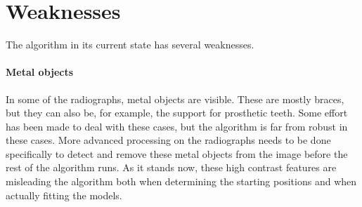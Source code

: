 \documentclass[a4paper,10pt]{article}
\begin{document}
\section{Weaknesses}
The algorithm in its current state has several weaknesses.

\paragraph{Metal objects} In some of the radiographs, metal objects are visible. These are mostly braces, but they can also be, for example, the support for prosthetic teeth. Some effort has been made to deal with these cases, but the algorithm is far from robust in these cases. More advanced processing on the radiographs needs to be done specifically to detect and remove these metal objects from the image before the rest of the algorithm runs. As it stands now, these high contrast features are misleading the algorithm both when determining the starting positions and when actually fitting the models.
\end{document}
